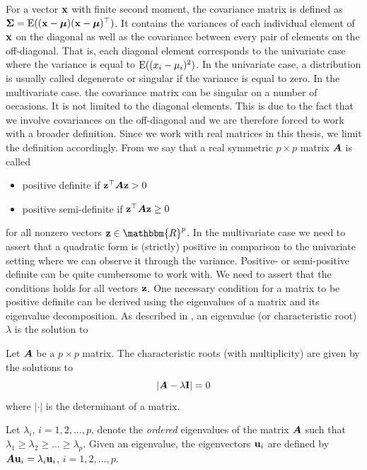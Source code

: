 \documentclass[]{book}\usepackage{knitr}
\begin{document}
For a vector $\mathbf{x}$ with finite second moment, the covariance matrix is defined as $\mathbf{\Sigma}=\operatorname{E}((\mathbf{x} - \mbox{\boldmath$\mu$})(\mathbf{x} - \mbox{\boldmath$\mu$})^\top)$. 
It contains the variances of each individual element of $\mathbf{x}$ on the diagonal as well as the covariance between every pair of elements on the off-diagonal. 
That is, each diagonal element corresponds to the univariate case where the variance is equal to $\operatorname{E}((x_i - \mu_i)^2)$. 
In the univariate case, a distribution is usually called degenerate or singular if the variance is equal to zero. 
In the multivariate case. the covariance matrix can be singular on a number of occasions. 
It is not limited to the diagonal elements.    
This is due to the fact that we involve covariances on the off-diagonal and we are therefore forced to work with a broader definition.  
Since we work with real matrices in this thesis, we limit the definition accordingly. 
From \textcite[ch 14.2]{harville1997matrix} we say that a real symmetric $p\times p$ matrix $\mbox{\boldmath$A$}$ is called 
\begin{itemize}
	\item positive definite if $\mathbf{z}^\top \mbox{\boldmath$A$} \mathbf{z} > 0$
	\item positive semi-definite if $\mathbf{z}^\top \mbox{\boldmath$A$} \mathbf{z} \geq 0$
\end{itemize}
for all nonzero vectors $\bz \in \mathbbm{R}^p$.
In the multivariate case we need to assert that a quadratic form is (strictly) positive in comparison to the univariate setting where we can observe it through the variance. 
Positive- or semi-positive definite can be quite cumbersome to work with. 
We need to assert that the conditions holds for all vectors $\mathbf{z}$. 
One necessary condition for a matrix to be positive definite can be derived using the eigenvalues of a matrix and its eigenvalue decomposition. 
As described in \textcite[ch. 21]{harville1997matrix}, an eigenvalue (or characteristic root) $\lambda$ is the solution to 
\begin{definition}\label{def:eigenvalue} 
	Let $\mbox{\boldmath$A$}$ be a $p\times p$ matrix. The characteristic roots (with multiplicity) are given by the solutions to
	\begin{equation*}
		\left|\mbox{\boldmath$A$} - \lambda \mathbf{I}\right| = 0
	\end{equation*}
	where $|\cdot|$ is the determinant of a matrix.
\end{definition} 
Let $\lambda_i$, $i=1,2,...,p$, denote the \textit{ordered} eigenvalues of the matrix $\mbox{\boldmath$A$}$ such that $\lambda_1\geq \lambda_2 \geq ... \geq \lambda_p$.
Given an eigenvalue, the eigenvectors $\mathbf{u}_i$ are defined by $\mbox{\boldmath$A$} \mathbf{u}_i = \lambda_i \mathbf{u}_i$, $i=1,2,...,p$. 
\end{document}
